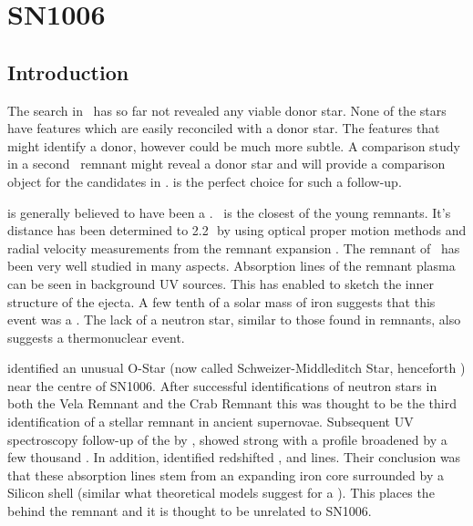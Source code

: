 \chapter{SN1006}
\label{chap:sn1006}


\section{Introduction}

The search in \ has so far not revealed any viable donor star. None of the stars have features which are easily reconciled with a donor star. The features that might identify a donor, however could be much more subtle. A comparison study in a second \snia\ remnant might reveal a donor star and will provide a comparison object for the candidates in .  is the perfect choice for such a follow-up. 

 is generally believed to have been a \snia.  \ is the closest of the young \snia remnants. It's distance has been determined to 2.2\,\kpc\ by using optical proper motion methods and radial velocity measurements from the remnant expansion \citep{2003ApJ...585..324W}. The remnant of \ has been very well studied in many aspects. Absorption lines of the remnant plasma can be seen in background UV sources. This has enabled \citet{2005ApJ...624..189W} to sketch the inner structure of the ejecta. A few tenth of a solar mass of iron suggests that this event was a \snia. The lack of a neutron star, similar to those found in \snii remnants, also suggests a thermonuclear event. 

\citet{1980ApJ...241.1039S} identified an unusual O-Star (now called Schweizer-Middleditch Star, henceforth \smstar) near the centre of SN1006. After successful identifications of neutron stars in both the Vela Remnant and the Crab Remnant this was thought to be the third identification of a stellar remnant in ancient supernovae. Subsequent UV spectroscopy follow-up of the \smstar by \citet{1983ApJ...269L...5W} , showed strong   with a profile broadened by a few thousand \kms. In addition, \citet{1983ApJ...269L...5W} identified redshifted ,  and  lines. Their conclusion was that these absorption lines stem from an expanding iron core surrounded by a Silicon shell (similar what theoretical models suggest for a \sneia). This places the \smstar behind the remnant and it is thought to be unrelated to SN1006. 


